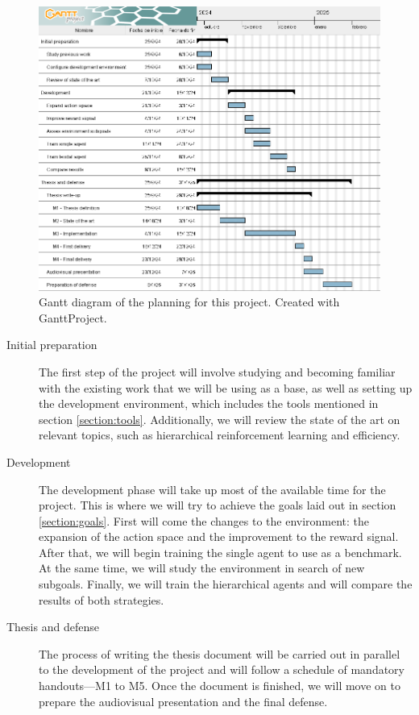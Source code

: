 \begin{figure}[t]
    \centering
    \includegraphics[width=.9\textwidth]{figs/TFM_Gannt.png}
    \caption[Gantt diagram of the planning for this project]{Gantt diagram of the planning for this project. Created with GanttProject\protect\footnotemark.}
    \label{fig:gantt}
\end{figure}

\begin{description}
    \item[Initial preparation] The first step of the project will involve studying and becoming familiar with the existing work that we will be using as a base, as well as setting up the development environment, which includes the tools mentioned in section \ref{section:tools}. Additionally, we will review the state of the art on relevant topics, such as hierarchical reinforcement learning and efficiency.
    \item[Development] The development phase will take up most of the available time for the project. This is where we will try to achieve the goals laid out in section \ref{section:goals}. First will come the changes to the environment: the expansion of the action space and the improvement to the reward signal. After that, we will begin training the single agent to use as a benchmark. At the same time, we will study the environment in search of new subgoals. Finally, we will train the hierarchical agents and will compare the results of both strategies.
    \item[Thesis and defense] The process of writing the thesis document will be carried out in parallel to the development of the project and will follow a schedule of mandatory handouts---M1 to M5. Once the document is finished, we will move on to prepare the audiovisual presentation and the final defense.
\end{description}

